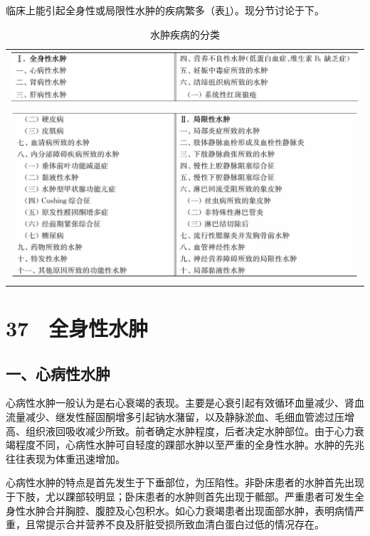 临床上能引起全身性或局限性水肿的疾病繁多（表\ref{tab11-1}）。现分节讨论于下。

\begin{longtable}{c}
 \caption{水肿疾病的分类}
 \label{tab11-1}
 \endfirsthead
 \caption[]{水肿疾病的分类}
 \endhead
 \includegraphics[width=\textwidth,height=\textheight,keepaspectratio]{./images/Image00079.jpg}\\
 \includegraphics[width=\textwidth,height=\textheight,keepaspectratio]{./images/Image00080.jpg}
 \end{longtable}

\protect\hypertarget{text00104.html}{}{}

\section{37　全身性水肿}

\subsection{一、心病性水肿}

心病性水肿一般认为是右心衰竭的表现。主要是心衰引起有效循环血量减少、肾血流量减少、继发性醛固酮增多引起钠水潴留，以及静脉淤血、毛细血管滤过压增高、组织液回吸收减少所致。前者确定水肿程度，后者决定水肿部位。由于心力衰竭程度不同，心病性水肿可自轻度的踝部水肿以至严重的全身性水肿。水肿的先兆往往表现为体重迅速增加。

心病性水肿的特点是首先发生于下垂部位，为压陷性。非卧床患者的水肿首先出现于下肢，尤以踝部较明显；卧床患者的水肿则首先出现于骶部。严重患者可发生全身性水肿合并胸腔、腹腔及心包积水。如心力衰竭患者出现面部水肿，表明病情严重，且常提示合并营养不良及肝脏受损所致血清白蛋白过低的情况存在。

